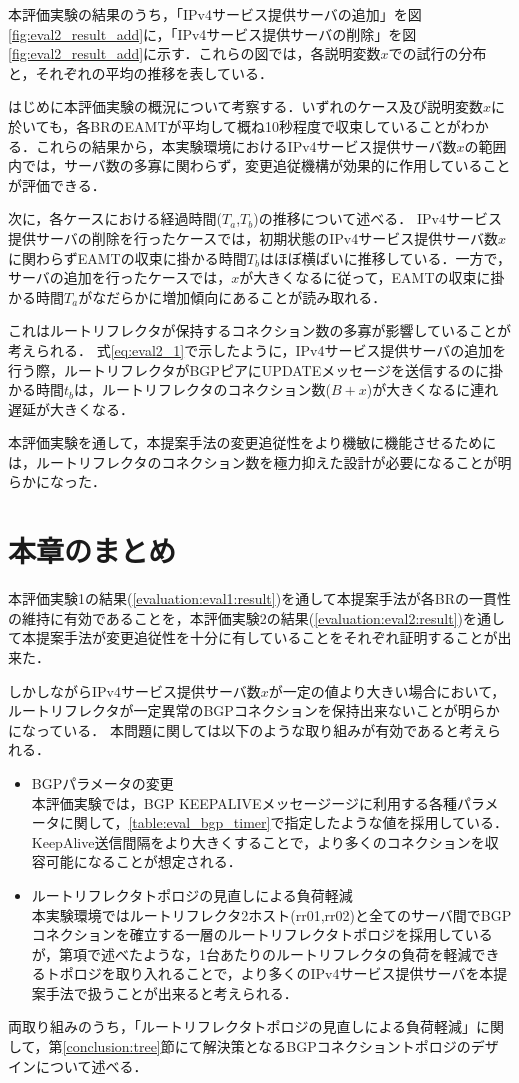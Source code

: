 本評価実験の結果のうち，「IPv4サービス提供サーバの追加」を図\ref{fig:eval2_result_add}に，「IPv4サービス提供サーバの削除」を図\ref{fig:eval2_result_add}に示す．これらの図では，各説明変数$x$での試行の分布と，それぞれの平均の推移を表している．

はじめに本評価実験の概況について考察する．いずれのケース及び説明変数$x$に於いても，各BRのEAMTが平均して概ね10秒程度で収束していることがわかる．これらの結果から，本実験環境におけるIPv4サービス提供サーバ数$x$の範囲内では，サーバ数の多寡に関わらず，変更追従機構が効果的に作用していることが評価できる．


次に，各ケースにおける経過時間($T_a$,$T_b$)の推移について述べる．
IPv4サービス提供サーバの削除を行ったケースでは，初期状態のIPv4サービス提供サーバ数$x$に関わらずEAMTの収束に掛かる時間$T_b$はほぼ横ばいに推移している．一方で，サーバの追加を行ったケースでは，$x$が大きくなるに従って，EAMTの収束に掛かる時間$T_a$がなだらかに増加傾向にあることが読み取れる．

これはルートリフレクタが保持するコネクション数の多寡が影響していることが考えられる．
式\ref{eq:eval2_1}で示したように，IPv4サービス提供サーバの追加を行う際，ルートリフレクタがBGPピアにUPDATEメッセージを送信するのに掛かる時間$t_b$は，ルートリフレクタのコネクション数($ B + x $)が大きくなるに連れ遅延が大きくなる．

本評価実験を通して，本提案手法の変更追従性をより機敏に機能させるためには，ルートリフレクタのコネクション数を極力抑えた設計が必要になることが明らかになった．



\newpage
\section{本章のまとめ}
\label{evaluation:consideration}
本評価実験1の結果(\ref{evaluation:eval1:result})を通して本提案手法が各BRの一貫性の維持に有効であることを，本評価実験2の結果(\ref{evaluation:eval2:result})を通して本提案手法が変更追従性を十分に有していることをそれぞれ証明することが出来た．

しかしながらIPv4サービス提供サーバ数$x$が一定の値より大きい場合において，ルートリフレクタが一定異常のBGPコネクションを保持出来ないことが明らかになっている．
本問題に関しては以下のような取り組みが有効であると考えられる．

\begin{itemize}
    \item BGPパラメータの変更 \\
    本評価実験では，BGP KEEPALIVEメッセージージに利用する各種パラメータに関して，\ref{table:eval_bgp_timer}で指定したような値を採用している．KeepAlive送信間隔をより大きくすることで，より多くのコネクションを収容可能になることが想定される．
    \item ルートリフレクタトポロジの見直しによる負荷軽減 \\
    本実験環境ではルートリフレクタ2ホスト(rr01,rr02)と全てのサーバ間でBGPコネクションを確立する一層のルートリフレクタトポロジを採用しているが，第\label{proposal:network_rr}項で述べたような，1台あたりのルートリフレクタの負荷を軽減できるトポロジを取り入れることで，より多くのIPv4サービス提供サーバを本提案手法で扱うことが出来ると考えられる．
\end{itemize}

両取り組みのうち，「ルートリフレクタトポロジの見直しによる負荷軽減」に関して，第\ref{conclusion:tree}節にて解決策となるBGPコネクショントポロジのデザインについて述べる．


